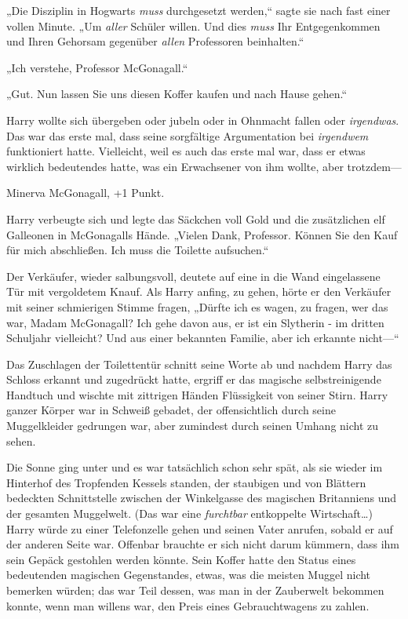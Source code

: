 {„Die Disziplin in Hogwarts \emph{muss} durchgesetzt werden,“ sagte sie nach fast einer vollen Minute. „Um \emph{aller} Schüler willen. Und dies \emph{muss} Ihr Entgegenkommen und Ihren Gehorsam gegenüber \emph{allen} Professoren beinhalten.“

„Ich verstehe, Professor McGonagall.“

„Gut. Nun lassen Sie uns diesen Koffer kaufen und nach Hause gehen.“

Harry wollte sich übergeben oder jubeln oder in Ohnmacht fallen oder \emph{irgendwas}. Das war das erste mal, dass seine sorgfältige Argumentation bei \emph{irgendwem} funktioniert hatte. Vielleicht, weil es auch das erste mal war, dass er etwas wirklich bedeutendes hatte, was ein Erwachsener von ihm wollte, aber trotzdem—

Minerva McGonagall, +1 Punkt.

Harry verbeugte sich und legte das Säckchen voll Gold und die zusätzlichen elf Galleonen in McGonagalls Hände. „Vielen Dank, Professor. Können Sie den Kauf für mich abschließen. Ich muss die Toilette aufsuchen.“

Der Verkäufer, wieder salbungsvoll, deutete auf eine in die Wand eingelassene Tür mit vergoldetem Knauf. Als Harry anfing, zu gehen, hörte er den Verkäufer mit seiner schmierigen Stimme fragen, „Dürfte ich es wagen, zu fragen, wer das war, Madam McGonagall? Ich gehe davon aus, er ist ein Slytherin - im dritten Schuljahr vielleicht? Und aus einer bekannten Familie, aber ich erkannte nicht—“

Das Zuschlagen der Toilettentür schnitt seine Worte ab und nachdem Harry das Schloss erkannt und zugedrückt hatte, ergriff er das magische selbstreinigende Handtuch und wischte mit zittrigen Händen Flüssigkeit von seiner Stirn. Harry ganzer Körper war in Schweiß gebadet, der offensichtlich durch seine Muggelkleider gedrungen war, aber zumindest durch seinen Umhang nicht zu sehen.

Die Sonne ging unter und es war tatsächlich schon sehr spät, als sie wieder im Hinterhof des Tropfenden Kessels standen, der staubigen und von Blättern bedeckten Schnittstelle zwischen der Winkelgasse des magischen Britanniens und der gesamten Muggelwelt. (Das war eine \emph{furchtbar} entkoppelte Wirtschaft…) Harry würde zu einer Telefonzelle gehen und seinen Vater anrufen, sobald er auf der anderen Seite war. Offenbar brauchte er sich nicht darum kümmern, dass ihm sein Gepäck gestohlen werden könnte. Sein Koffer hatte den Status eines bedeutenden magischen Gegenstandes, etwas, was die meisten Muggel nicht bemerken würden; das war Teil dessen, was man in der Zauberwelt bekommen konnte, wenn man willens war, den Preis eines Gebrauchtwagens zu zahlen.

}

